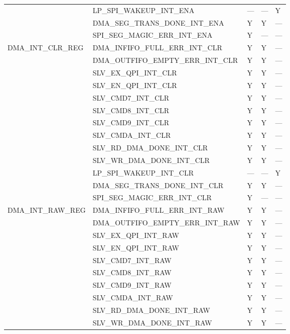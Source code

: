 \documentclass[main\_\_EN.tex]{subfiles}
\begin{document}
\begin{longtable}{|p{4.0cm}|p{6.5cm}|p{1.5cm}|p{1.5cm}|p{1.5cm}|}
& LP\_SPI\_WAKEUP\_INT\_ENA & --- & --- & Y \\ \cline{2-5}
& DMA\_SEG\_TRANS\_DONE\_INT\_ENA & Y & Y & --- \\ \cline{2-5}
& SPI\_SEG\_MAGIC\_ERR\_INT\_ENA & Y & --- & --- \\ \hline
\multirow{13}{*}{DMA\_INT\_CLR\_REG} & DMA\_INFIFO\_FULL\_ERR\_INT\_CLR & Y & Y & --- \\ \cline{2-5}
& DMA\_OUTFIFO\_EMPTY\_ERR\_INT\_CLR & Y & Y & --- \\ \cline{2-5}
& SLV\_EX\_QPI\_INT\_CLR & Y & Y & --- \\ \cline{2-5}
& SLV\_EN\_QPI\_INT\_CLR & Y & Y & --- \\ \cline{2-5}
& SLV\_CMD7\_INT\_CLR & Y & Y & --- \\ \cline{2-5}
& SLV\_CMD8\_INT\_CLR & Y & Y & --- \\ \cline{2-5}
& SLV\_CMD9\_INT\_CLR & Y & Y & --- \\ \cline{2-5}
& SLV\_CMDA\_INT\_CLR & Y & Y & --- \\ \cline{2-5}
& SLV\_RD\_DMA\_DONE\_INT\_CLR & Y & Y & --- \\ \cline{2-5}
& SLV\_WR\_DMA\_DONE\_INT\_CLR & Y & Y & --- \\ \cline{2-5}
& LP\_SPI\_WAKEUP\_INT\_CLR & --- & --- & Y \\ \cline{2-5}
& DMA\_SEG\_TRANS\_DONE\_INT\_CLR & Y & Y & --- \\ \cline{2-5}
& SPI\_SEG\_MAGIC\_ERR\_INT\_CLR & Y & --- & --- \\ \hline
\multirow{13}{*}{DMA\_INT\_RAW\_REG} & DMA\_INFIFO\_FULL\_ERR\_INT\_RAW & Y & Y & --- \\ \cline{2-5}
& DMA\_OUTFIFO\_EMPTY\_ERR\_INT\_RAW & Y & Y & --- \\ \cline{2-5}
& SLV\_EX\_QPI\_INT\_RAW & Y & Y & --- \\ \cline{2-5}
& SLV\_EN\_QPI\_INT\_RAW & Y & Y & --- \\ \cline{2-5}
& SLV\_CMD7\_INT\_RAW & Y & Y & --- \\ \cline{2-5}
& SLV\_CMD8\_INT\_RAW & Y & Y & --- \\ \cline{2-5}
& SLV\_CMD9\_INT\_RAW & Y & Y & --- \\ \cline{2-5}
& SLV\_CMDA\_INT\_RAW & Y & Y & --- \\ \cline{2-5}
& SLV\_RD\_DMA\_DONE\_INT\_RAW & Y & Y & --- \\ \cline{2-5}
& SLV\_WR\_DMA\_DONE\_INT\_RAW & Y & Y & --- \\ \cline{2-5}

\end{longtable}
\end{document}
